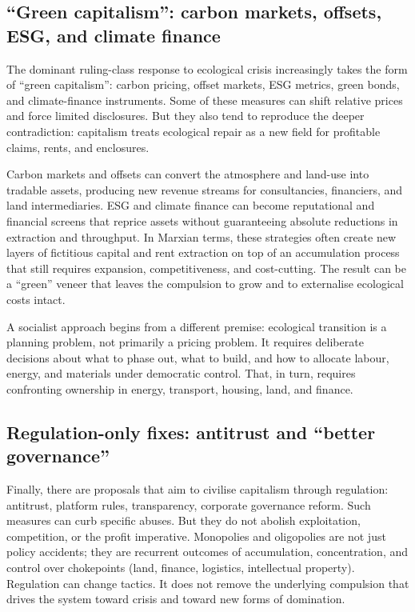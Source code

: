 \subsection{``Green capitalism'': carbon markets, offsets, ESG, and climate finance}
\label{sec:policy-green-capitalism}

The dominant ruling-class response to ecological crisis increasingly takes the form of ``green capitalism'': carbon pricing,
offset markets, ESG metrics, green bonds, and climate-finance instruments. Some of these measures can shift relative prices
and force limited disclosures. But they also tend to reproduce the deeper contradiction: capitalism treats ecological repair
as a new field for profitable claims, rents, and enclosures.

Carbon markets and offsets can convert the atmosphere and land-use into tradable assets, producing new revenue streams for
consultancies, financiers, and land intermediaries. ESG and climate finance can become reputational and financial screens
that reprice assets without guaranteeing absolute reductions in extraction and throughput. In Marxian terms, these strategies
often create new layers of fictitious capital and rent extraction on top of an accumulation process that still requires
expansion, competitiveness, and cost-cutting. The result can be a ``green'' veneer that leaves the compulsion to grow and to
externalise ecological costs intact.

A socialist approach begins from a different premise: ecological transition is a planning problem, not primarily a pricing
problem. It requires deliberate decisions about what to phase out, what to build, and how to allocate labour, energy, and
materials under democratic control. That, in turn, requires confronting ownership in energy, transport, housing, land, and
finance.

\subsection{Regulation-only fixes: antitrust and ``better governance''}
\label{sec:policy-regulation-only}

Finally, there are proposals that aim to civilise capitalism through regulation: antitrust, platform rules, transparency,
corporate governance reform. Such measures can curb specific abuses. But they do not abolish exploitation, competition, or
the profit imperative. Monopolies and oligopolies are not just policy accidents; they are recurrent outcomes of accumulation,
concentration, and control over chokepoints (land, finance, logistics, intellectual property). Regulation can change tactics.
It does not remove the underlying compulsion that drives the system toward crisis and toward new forms of domination.


